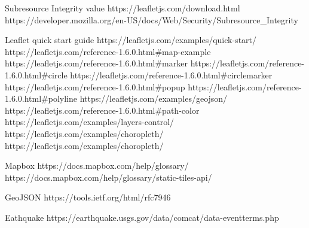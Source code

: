 Subresource Integrity value
https://leafletjs.com/download.html
https://developer.mozilla.org/en-US/docs/Web/Security/Subresource_Integrity

Leaflet quick start guide
https://leafletjs.com/examples/quick-start/
https://leafletjs.com/reference-1.6.0.html#map-example
https://leafletjs.com/reference-1.6.0.html#marker
https://leafletjs.com/reference-1.6.0.html#circle
https://leafletjs.com/reference-1.6.0.html#circlemarker
https://leafletjs.com/reference-1.6.0.html#popup
https://leafletjs.com/reference-1.6.0.html#polyline
https://leafletjs.com/examples/geojson/
https://leafletjs.com/reference-1.6.0.html#path-color
https://leafletjs.com/examples/layers-control/
https://leafletjs.com/examples/choropleth/
https://leafletjs.com/examples/choropleth/

Mapbox
https://docs.mapbox.com/help/glossary/
https://docs.mapbox.com/help/glossary/static-tiles-api/


GeoJSON
https://tools.ietf.org/html/rfc7946

Eathquake
https://earthquake.usgs.gov/data/comcat/data-eventterms.php
